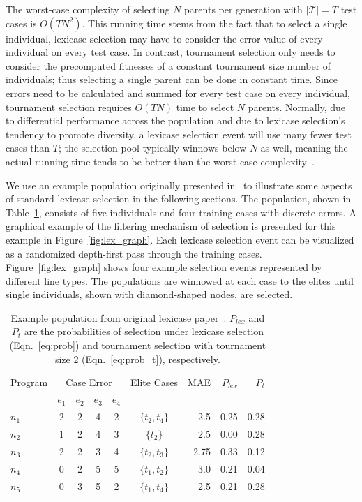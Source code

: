 \documentclass[twoside]{article}
\begin{document}
The worst-case complexity of selecting $N$ parents per generation with $|\mathcal{T}| = T$ test cases is $O(TN^2)$. This running time stems from the fact that to select a single individual, lexicase selection may have to consider the error value of every individual on every test case.
In contrast, tournament selection only needs to consider the precomputed fitnesses of a constant tournament size number of individuals; thus selecting a single parent can be done in constant time. Since errors need to be calculated and summed for every test case on every individual, tournament selection requires $O(TN)$ time to select $N$ parents.
Normally, due to differential performance across the population and due to lexicase selection's tendency to promote diversity, a lexicase selection event will use many fewer test cases than $T$; the selection pool typically winnows below $N$ as well, meaning the actual running time tends to be better than the worst-case complexity~\citep{helmuth_solving_2014, la_cava_epsilon-lexicase_2016}. 

We use an example population originally presented in~\citep{spector_assessment_2012} to illustrate some aspects of standard lexicase selection in the following sections. The population, shown in Table~\ref{tbl:ex}, consists of five individuals and four training cases with discrete errors. A graphical example of the filtering mechanism of selection is presented for this example in Figure~\ref{fig:lex_graph}. Each lexicase selection event can be visualized as a randomized depth-first pass through the training cases. Figure~\ref{fig:lex_graph} shows four example selection events represented by different line types. The populations are winnowed at each case to the elites until single individuals, shown with diamond-shaped nodes, are selected. 

\begin{table}
\centering
\caption{Example population from original lexicase paper~\citep{spector_assessment_2012}. $P_{lex}$ and $P_t$ are the probabilities of selection under lexicase selection (Eqn.~\ref{eq:prob}) and tournament selection with tournament size 2 (Eqn.~\ref{eq:prob_t}), respectively.}\label{tbl:ex}
\begin{tabular}{l|cccc|c|r|rr}\toprule
Program & \multicolumn{4}{c}{Case Error} & Elite Cases & MAE & $P_{lex}$ & $P_{t}$\\
& $e_1$ & $e_2$ & $e_3$ & $e_4$ & \\ \midrule
$n_1$ & 2 & 2 & 4 & 2 & $\{t_2,t_4\}$ &	2.5		&	0.25 	& 	0.28	\\
$n_2$ & 1 & 2 & 4 & 3 & $\{t_2\}$		&	2.5		&	0.00	&	0.28	\\
$n_3$ & 2 & 2 & 3 & 4 & $\{t_2,t_3\}$ &	2.75	& 	0.33	&	0.12	\\
$n_4$ & 0 & 2 & 5 & 5 & $\{t_1,t_2\}$ &	3.0		& 	0.21	&	0.04	\\
$n_5$ & 0 & 3 & 5 & 2 & $\{t_1,t_4\}$ &	2.5		&	0.21	&	0.28	\\ \bottomrule
\end{tabular}
\end{table}
\end{document}
